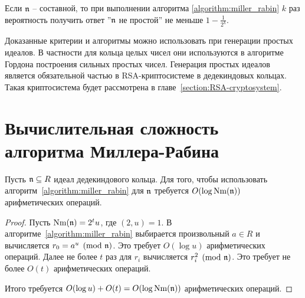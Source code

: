 \documentclass[_00_dissertation.tex]{subfiles}
\begin{document}
\begin{remark}
    Если $\mathfrak{n}$ -- составной, то при выполнении алгоритма \ref{algorithm:miller_rabin} $k$ раз вероятность получить ответ ''$\mathfrak{n}$ не простой'' не меньше $1 - \frac{1}{2^k}$.
\end{remark}

\begin{remark}
    Доказанные критерии и алгоритмы можно использовать при генерации простых идеалов.
    В частности для кольца целых чисел они используются в алгоритме Гордона построения сильных простых чисел.
    Генерация простых идеалов является обязательной частью в RSA-криптосистеме в дедекиндовых кольцах.
    Такая криптосистема будет рассмотрена в главе~\ref{section:RSA-cryptosystem}.
\end{remark}

\section{Вычислительная сложность алгоритма Миллера-Рабина}

\begin{statement}
    Пусть $\mathfrak{n} \subseteq R$ идеал дедекиндового кольца.
    Для того, чтобы использовать алгоритм~\ref{algorithm:miller_rabin} для $\mathfrak{n}$ требуется $O(\log \textrm{Nm}(\mathfrak{n}))$ арифметических операций.
\end{statement}
\begin{proof}
    Пусть $\textrm{Nm}(\mathfrak{n}) = 2^t u$, где $(2, u) = 1$.
    В алгоритме~\ref{algorithm:miller_rabin} выбирается произвольный $a \in R$ и вычисляется $r_0 = a^u \pmod{\mathfrak{n}}$.
    Это требует $O(\log u)$ арифметических операций.
    Далее не более $t$ раз для $r_i$ вычисляется $r_i^2 \pmod{\mathfrak{n}}$.
    Это требует не более $O(t)$ арифметических операций.

    Итого требуется $O(\log u) + O(t) = O(\log \textrm{Nm}(\mathfrak{n}))$ арифметических операций.
\end{proof}


\end{document}
